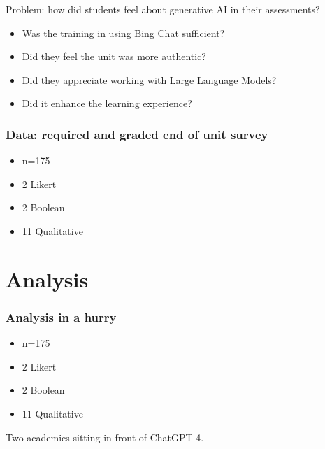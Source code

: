 \documentclass[xcolor={dvipsnames},aspectratio=169]{beamer}
\begin{document}
\begin{frame}{Problem: how did students feel about generative AI in their assessments?}

\begin{itemize}
    \item Was the training in using Bing Chat sufficient?
    \item Did they feel the unit was more authentic?
    \item Did they appreciate working with Large Language Models?
    \item Did it enhance the learning experience?
\end{itemize}

\end{frame}

\begin{frame}
\frametitle{Data: required and graded end of unit survey}

\begin{itemize}
    \item n=175
    \item 2 Likert
    \item 2 Boolean
    \item 11 Qualitative
\end{itemize}

\end{frame}

\section{Analysis}

\begin{frame}
\frametitle{Analysis in a hurry}

\begin{itemize}
    \item n=175
    \item 2 Likert
    \item 2 Boolean
    \item 11 Qualitative
\end{itemize}

Two academics sitting in front of ChatGPT 4.

\end{frame}
\end{document}
